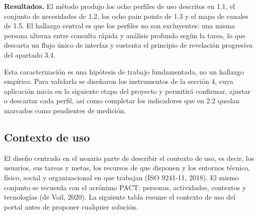 \begin{uxlist}
\end{uxlist}

\textbf{\textcolor{uxnavy}{Resultados.}} El método produjo los ocho perfiles de uso descritos
en 1.1, el conjunto de necesidades de 1.2, los ocho pain points de 1.3 y el mapa de canales
de 1.5. El hallazgo central es que los perfiles no son excluyentes: una misma persona
alterna entre consulta rápida y análisis profundo según la tarea, lo que descarta un flujo
único de interfaz y sustenta el principio de revelación progresiva del apartado 3.4.

\begin{uxnota}
Esta caracterización es una hipótesis de trabajo fundamentada, no un hallazgo empírico. Para
validarla se diseñaron los instrumentos de la sección 4, cuya aplicación inicia en la
siguiente etapa del proyecto y permitirá confirmar, ajustar o descartar cada perfil, así
como completar los indicadores que en 2.2 quedan marcados como pendientes de medición.
\end{uxnota}

\subsection{Contexto de uso}

El diseño centrado en el usuario parte de describir el contexto de uso, es decir, los
usuarios, sus tareas y metas, los recursos de que disponen y los entornos técnico, físico,
social y organizacional en que trabajan (ISO 9241-11, 2018). El mismo conjunto se recuerda
con el acrónimo PACT: personas, actividades, contextos y tecnologías (de Voil, 2020). La
siguiente tabla resume el contexto de uso del portal antes de proponer cualquier solución.


